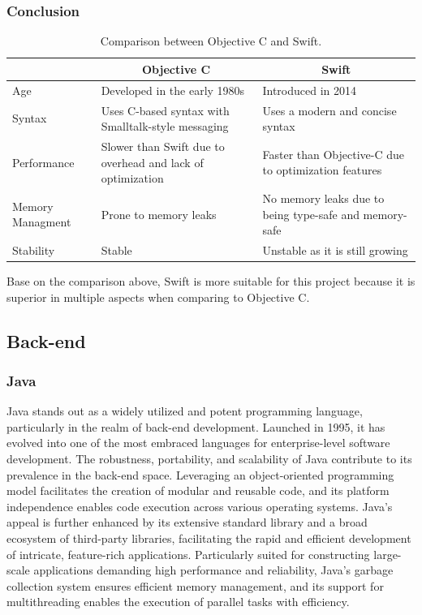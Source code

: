 \subsubsection{Conclusion}

\begin{table}[H]
    \centering
    \begin{tabular}{| >{\centering\arraybackslash}m{2.5cm} | m{6cm} | m{6cm} |}
        \hline
        \multicolumn{1}{|c|}{\textbf{Feature}} & \multicolumn{1}{c|}{\textbf{Objective C}} & \multicolumn{1}{c|}{\textbf{Swift}} \\ \hline
        Age & Developed in the early 1980s & Introduced in 2014 \\ \hline
        Syntax & Uses C-based syntax with Smalltalk-style messaging & Uses a modern and concise syntax \\ \hline
        Performance & Slower than Swift due to overhead and lack of optimization & Faster than Objective-C due to optimization features \\ \hline
        Memory Managment & Prone to memory leaks & No memory leaks due to being type-safe and memory-safe \\ \hline
        Stability & Stable & Unstable as it is still growing \\ \hline
    \end{tabular}
    \caption{Comparison between Objective C and Swift.}
\end{table}

Base on the comparison above, Swift is more suitable for this project because it is superior in multiple aspects when comparing to Objective C.

\newpage
\subsection{Back-end}

\subsubsection{Java}

Java stands out as a widely utilized and potent programming language, particularly in the realm of back-end development. Launched in 1995, it has evolved into one of the most embraced languages for enterprise-level software development. The robustness, portability, and scalability of Java contribute to its prevalence in the back-end space. Leveraging an object-oriented programming model facilitates the creation of modular and reusable code, and its platform independence enables code execution across various operating systems. Java's appeal is further enhanced by its extensive standard library and a broad ecosystem of third-party libraries, facilitating the rapid and efficient development of intricate, feature-rich applications. Particularly suited for constructing large-scale applications demanding high performance and reliability, Java's garbage collection system ensures efficient memory management, and its support for multithreading enables the execution of parallel tasks with efficiency.


